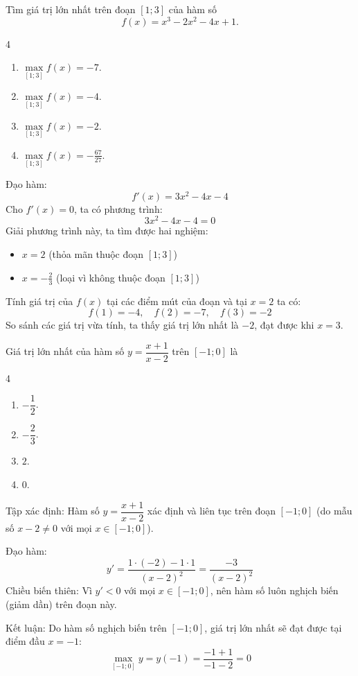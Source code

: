 \begin{baitap}
	Tìm giá trị lớn nhất trên đoạn $[1; 3]$ của hàm số $$f(x) = x^3 - 2x^2 - 4x + 1.$$
	\begin{multicols}{4}
		\begin{enumerate}
			\item $\max\limits_{[1;3]} f(x) = -7$.
			\item $\max\limits_{[1;3]} f(x) = -4$.
			\item $\max\limits_{[1;3]} f(x) = -2$.
			\item $\max\limits_{[1;3]} f(x) = -\frac{67}{27}$.
		\end{enumerate}
	\end{multicols}
	\begin{traloi}
		Đạo hàm:$$f'(x) = 3x^2 - 4x - 4$$
		Cho $f'(x) = 0$, ta có phương trình:$$3x^2 - 4x - 4 = 0$$Giải phương trình này, ta tìm được hai nghiệm:
		\begin{itemize}
			\item $x = 2$ (thỏa mãn thuộc đoạn $[1; 3]$)
			\item $x = -\frac{2}{3}$ (loại vì không thuộc đoạn $[1; 3]$)
		\end{itemize}
		Tính giá trị của $f(x)$ tại các điểm mút của đoạn và tại $ x=2 $ ta có:
		$$f(1) = -4,\quad f(2) = -7,\quad f(3) = -2$$
		So sánh các giá trị vừa tính, ta thấy giá trị lớn nhất là $-2$, đạt được khi $x = 3$.
	\end{traloi}
\end{baitap}
\begin{baitap}
	Giá trị lớn nhất của hàm số $y = \dfrac{x + 1}{x - 2}$ trên $[-1; 0]$ là
	\begin{multicols}{4}
		
		\begin{enumerate}
			\item $-\dfrac{1}{2}$.
			\item $-\dfrac{2}{3}$.
			\item $2$.
			\item $0$.
		\end{enumerate}
	\end{multicols}
	\begin{traloi}
		\dapan{D}
		Tập xác định: Hàm số $y = \dfrac{x + 1}{x - 2}$ xác định và liên tục trên đoạn $[-1; 0]$ (do mẫu số $x - 2 \neq 0$ với mọi $x \in [-1; 0]$).
		
		Đạo hàm:$$y' = \dfrac{1 \cdot (-2) - 1 \cdot 1}{(x - 2)^2} = \dfrac{-3}{(x - 2)^2}$$
		Chiều biến thiên: Vì $y' < 0$ với mọi $x \in [-1; 0]$, nên hàm số luôn nghịch biến (giảm dần) trên đoạn này.
		
		Kết luận: Do hàm số nghịch biến trên $[-1; 0]$, giá trị lớn nhất sẽ đạt được tại điểm đầu $x = -1$:$$\max\limits_{[-1; 0]} y = y(-1) = \dfrac{-1 + 1}{-1 - 2} = 0$$
	\end{traloi}
\end{baitap}

